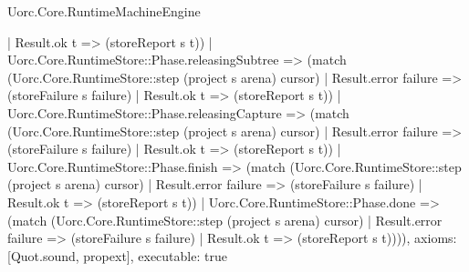 \begin{lexlean}{Uorc.Core.RuntimeMachineEngine}
\begin{semanticmodule}
{      | Result.ok t => (storeReport s t))
    | Uorc.Core.RuntimeStore::Phase.releasingSubtree => (match (Uorc.Core.RuntimeStore::step (project s arena) cursor)
      | Result.error failure => (storeFailure s failure)
      | Result.ok t => (storeReport s t))
    | Uorc.Core.RuntimeStore::Phase.releasingCapture => (match (Uorc.Core.RuntimeStore::step (project s arena) cursor)
      | Result.error failure => (storeFailure s failure)
      | Result.ok t => (storeReport s t))
    | Uorc.Core.RuntimeStore::Phase.finish => (match (Uorc.Core.RuntimeStore::step (project s arena) cursor)
      | Result.error failure => (storeFailure s failure)
      | Result.ok t => (storeReport s t))
    | Uorc.Core.RuntimeStore::Phase.done => (match (Uorc.Core.RuntimeStore::step (project s arena) cursor)
      | Result.error failure => (storeFailure s failure)
      | Result.ok t => (storeReport s t)))),
  axioms: [Quot.sound, propext],
  executable: true
}


\end{semanticmodule}
\end{lexlean}
